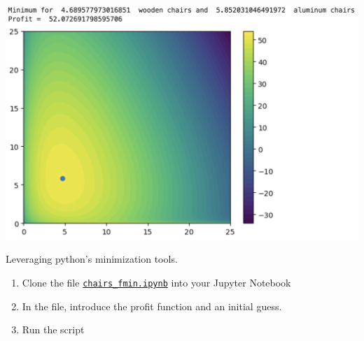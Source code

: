 \documentclass{workbook}
\begin{document}
\begin{slide}

\includegraphics[width=.75\textwidth]{images/chairs-profit.png}
	
\end{slide}

\begin{slide}

\begin{parts}
\setcounter{partsitem}{5}
	\item Leveraging python's minimization tools.
	\begin{enumerate}
		\item Clone the file \href{https://utoronto.syzygy.ca/jupyter/user-redirect/git-pull?repo=https://github.com/bigfatbernie/IBLMathModeling&subPath=python/chairs_fmin.ipynb}{\tt chairs\_fmin.ipynb} into your Jupyter Notebook
		\item In the file, introduce the profit function and an initial guess.
		\item Run the script
	\end{enumerate}
\end{parts}
\end{slide}
\end{document}
